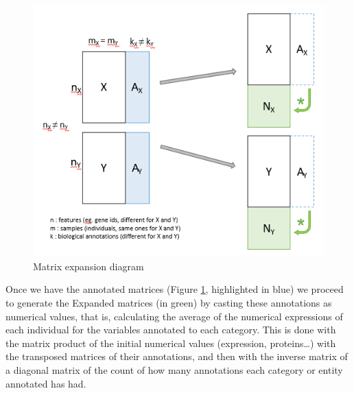 \documentclass[a4paper, nobind]{templates/ociamthesis}
\begin{document}
\begin{figure}

{\centering \includegraphics[width=0.95\linewidth]{figures/chapter3/3-4_matrix_expansion_diagram} 

}

\caption{Matrix expansion diagram}\label{fig:fig3-4}
\end{figure}

Once we have the annotated matrices (Figure \ref{fig:fig3-4}, highlighted in blue) we proceed to generate the Expanded matrices (in green) by casting these annotations as numerical values, that is, calculating the average of the numerical expressions of each individual for the variables annotated to each category. This is done with the matrix product of the initial numerical values (expression, proteins\ldots) with the transposed matrices of their annotations, and then with the inverse matrix of a diagonal matrix of the count of how many annotations each category or entity annotated has had.
\end{document}
